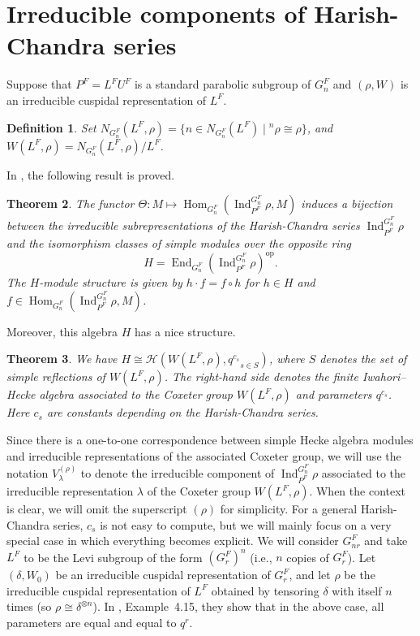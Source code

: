 \documentclass[12pt]{article}
\newtheorem{theorem}{Theorem}[section]
\newtheorem{definition}[theorem]{Definition}
\theoremstyle{remark}
\begin{document}
\section{Irreducible components of Harish-Chandra series}
Suppose that $P^F = L^F U^F$ is a standard parabolic subgroup of $G^F_n$ and $(\rho, W)$ is an irreducible cuspidal representation of $L^F$.
\begin{definition}
Set $N_{G^F_n}(L^F, \rho) = \{ n \in N_{G^F_n}(L^F) \mid {}^n\rho \cong \rho \}$, and $W(L^F, \rho) = N_{G^F_n}(L^F, \rho) / L^F$.
\end{definition}
In \cite[Chapter 6]{DigneMichel2020}, the following result is proved.
\begin{theorem}
The functor $\Theta \colon M \longmapsto \operatorname{Hom}_{G^F_n}(\operatorname{Ind}_{P^F}^{G^F_n} \rho, M)$ induces a bijection between the irreducible subrepresentations of the Harish-Chandra series $\operatorname{Ind}_{P^F}^{G^F_n} \rho$ and the isomorphism classes of simple modules over the opposite ring
\[
H = \operatorname{End}_{G^F_n}(\operatorname{Ind}_{P^F}^{G^F_n} \rho)^{\mathrm{op}} .
\]
The $H$-module structure is given by $h \cdot f = f \circ h$ for $h \in H$ and $f \in \operatorname{Hom}_{G^F_n}(\operatorname{Ind}_{P^F}^{G^F_n} \rho, M)$.
\end{theorem}
Moreover, this algebra $H$ has a nice structure.
\begin{theorem}
We have $H \cong \mathcal{H}(W(L^F, \rho), {q^{c_s}}_{s \in S})$, where $S$ denotes the set of simple reflections of $W(L^F,\rho)$. The right-hand side denotes the finite Iwahori--Hecke algebra associated to the Coxeter group $W(L^F, \rho)$ and parameters $q^{c_s}$. Here $c_s$ are constants depending on the Harish-Chandra series.
\end{theorem}
Since there is a one-to-one correspondence between simple Hecke algebra modules and irreducible representations of the associated Coxeter group, we will use the notation $V^{(\rho)}_\lambda$ to denote the irreducible component of $\operatorname{Ind}_{P^F}^{G^F_n} \rho$ associated to the irreducible representation $\lambda$ of the Coxeter group $W(L^F,\rho)$. When the context is clear, we will omit the superscript $(\rho)$ for simplicity.
For a general Harish-Chandra series, $c_s$ is not easy to compute, but we will mainly focus on a very special case in which everything becomes explicit.
We will consider $G^F_{nr}$ and take $L^F$ to be the Levi subgroup of the form $(G^F_r)^n$ (i.e., $n$ copies of $G^F_r$). Let $(\delta, W_0)$ be an irreducible cuspidal representation of $G^F_r$, and let $\rho$ be the irreducible cuspidal representation of $L^F$ obtained by tensoring $\delta$ with itself $n$ times (so $\rho \cong \delta^{\otimes n}$). In \cite{HowlettLehrer1980}, Example~4.15, they show that in the above case, all parameters are equal and equal to $q^r$.
\end{document}

